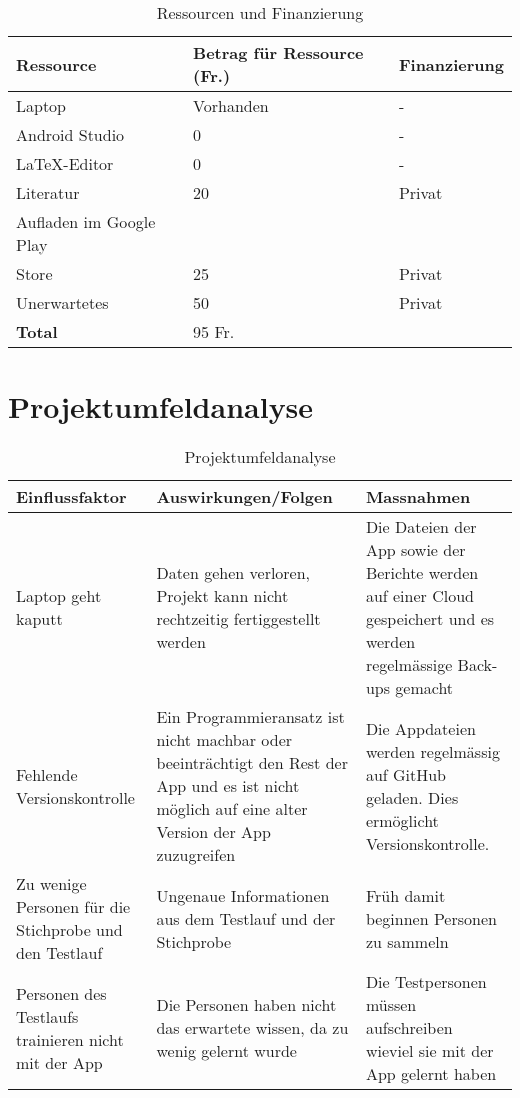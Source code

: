 \begin{center}
\begin{table}[h]
\begin{tabularx}{\textwidth}{X|X|X}
    \textbf{Ressource} & \textbf{Betrag für Ressource (Fr.)} & \textbf{Finanzierung} \\ \hline
    Laptop & Vorhanden & - \\
    Android Studio & 0 & - \\
    \LaTeX -Editor & 0 & - \\
    Literatur & 20 & Privat\\
    Aufladen im Google Play \\Store & 25 & Privat \\
    Unerwartetes & 50 & Privat \\ \hline
    \textbf{Total} & 95 Fr. & 
\end{tabularx}
\caption{Ressourcen und Finanzierung}
\end{table}
\end{center}

\section{Projektumfeldanalyse}
\begin{table}[h]
\begin{tabularx}{\textwidth}{p{}|X|X}
    \textbf{Einflussfaktor} & \textbf{Auswirkungen/Folgen} & \textbf{Massnahmen} \\ \hline
    Laptop geht kaputt & Daten gehen verloren, Projekt kann nicht rechtzeitig fertiggestellt werden & Die Dateien der App sowie der Berichte werden auf einer Cloud gespeichert und es werden regelmässige Back-ups gemacht\\ \hline
    Fehlende Versionskontrolle & Ein Programmieransatz ist nicht machbar oder beeinträchtigt den Rest der App und es ist nicht möglich auf eine alter Version der App zuzugreifen & Die Appdateien werden regelmässig auf GitHub geladen. Dies ermöglicht Versionskontrolle. \\ \hline
    Zu wenige Personen für die Stichprobe und den Testlauf & Ungenaue Informationen aus dem Testlauf und der Stichprobe & Früh damit beginnen Personen zu sammeln \\ \hline
    Personen des Testlaufs trainieren nicht mit der App & Die Personen haben nicht das erwartete wissen, da zu wenig gelernt wurde & Die Testpersonen müssen aufschreiben wieviel sie mit der App gelernt haben \\
\end{tabularx}
\caption{Projektumfeldanalyse}
\end{table}
